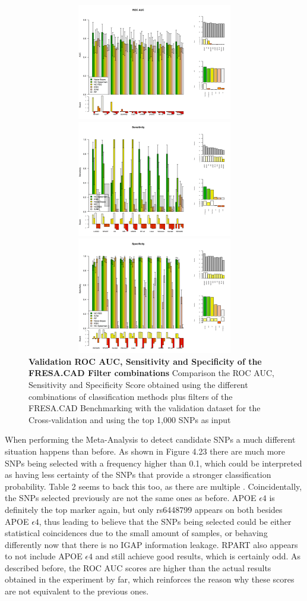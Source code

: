    
\begin{figure}[!ht]
\centerline{\includegraphics[width=5in,height=2in]{images/results/fresaConcVal.png}}
\centerline{\includegraphics[width=5in,height=2in]{images/results/fresaSensVal.png}}
\centerline{\includegraphics[width=5in,height=2in]{images/results/fresaSpecVal.png}}
\caption{{\bf Validation ROC AUC, Sensitivity and Specificity of the FRESA.CAD Filter combinations} 
Comparison the ROC AUC, Sensitivity and Specificity Score obtained using the different combinations of classification methods plus filters of the FRESA.CAD Benchmarking with the validation dataset for the Cross-validation and using the top 1,000 SNPs as input}
\label{fig22}
\end{figure}
\clearpage
When performing the Meta-Analysis to detect candidate SNPs a much different situation happens than before. As shown in Figure 4.23 there are much more SNPs being selected with a frequency higher than 0.1, which could be interpreted as having less certainty of the SNPs that provide a stronger classification probability. Table 2 seems to back this too, as there are multiple . Coincidentally, the SNPs selected previously are not the same ones as before. APOE $\epsilon4$ is definitely the top marker again, but only rs6448799 appears on both besides APOE $\epsilon4$, thus leading to believe that the SNPs being selected could be either statistical coincidences due to the small amount of samples, or behaving differently now that there is no IGAP information leakage. RPART also appears to not include APOE $\epsilon4$ and still achieve good results, which is certainly odd. As described before, the ROC AUC scores are higher than the actual results obtained in the experiment by far, which reinforces the reason why these scores are not equivalent to the previous ones.
